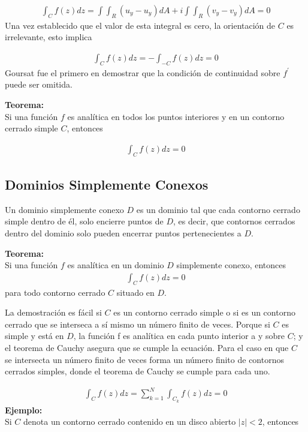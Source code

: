 \begin{gather}
    \int_C f(z)dz = \int\int_R (u_y - u_y)dA  + i\int\int_R (v_y - v_y)dA = 0
\end{gather}
Una vez establecido que el valor de esta integral es cero,
la orientación de $C$ es irrelevante, esto implica

\begin{gather*}
    \int_C f(z)dz = - \int_{-C} f(z)dz  = 0
\end{gather*}
Goursat fue el primero en demostrar que la condición de continuidad sobre $f^{\prime}$ puede ser omitida.

\begin{mdframed}
    \textbf{Teorema:}\\
Si una función $f$ es analítica en todos los puntos interiores y en un contorno cerrado simple $C$, entonces

\begin{gather}
    \int_C f(z)dz = 0
\end{gather}
\end{mdframed}

\subsection{Dominios Simplemente Conexos}

Un dominio simplemente conexo $D$ es un dominio tal que cada contorno cerrado simple dentro de él, solo encierre puntos de $D$, es decir, que contornos cerrados dentro del dominio solo pueden encerrar puntos pertenecientes a $D$. 

\begin{mdframed}
    \textbf{Teorema:}\\
Si una función $f$ es analítica en un dominio $D$ simplemente conexo, entonces
\begin{gather}
    \int_C f(z)dz = 0
\end{gather}
para todo contorno cerrado $C$ situado en $D$.
\end{mdframed}
La demostración es fácil si $C$ es un contorno cerrado simple o si es un contorno cerrado que se interseca a sí mismo un número finito de veces. Porque si $C$ es simple y está en $D$, la función f es analítica en cada punto interior a y sobre $C$; y el teorema de Cauchy asegura que se cumple la ecuación. Para el caso en que $C$ se intersecta un número finito de veces forma un número finito de contornos cerrados simples, donde el teorema de Cauchy se cumple para cada uno.

\begin{gather*}
    \int_C f(z)dz  = \sum_{k=1}^{N} \int_{C_k}f(z)dz = 0
\end{gather*}
\textbf{Ejemplo:}\\
Si $C$ denota un contorno cerrado contenido en un disco abierto $|z| <2$, entonces 

